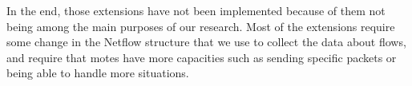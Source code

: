 In the end, those extensions have not been implemented because of them not being among the main purposes of our research. Most of the extensions require some change in the Netflow structure that we use to collect the data about flows, and require that motes have more capacities such as sending specific packets or being able to handle more situations.\\
